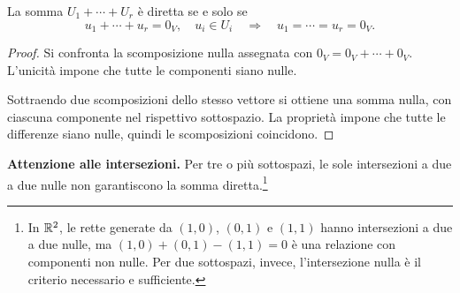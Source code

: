 \begin{osservazione}
La somma $U_1+\cdots+U_r$ è diretta se e solo se
\[
  u_1+\cdots+u_r=0_V,\quad u_i\in U_i
  \quad\Longrightarrow\quad u_1=\cdots=u_r=0_V.
\]
\end{osservazione}
\begin{proof}
\passomath{\Rightarrow} Si confronta la scomposizione nulla assegnata con $0_V=0_V+\cdots+0_V$. L'unicità impone che tutte le componenti siano nulle.

\passomath{\Leftarrow} Sottraendo due scomposizioni dello stesso vettore si ottiene una somma nulla, con ciascuna componente nel rispettivo sottospazio. La proprietà impone che tutte le differenze siano nulle, quindi le scomposizioni coincidono.
\end{proof}

\textbf{Attenzione alle intersezioni.} Per tre o più sottospazi, le sole intersezioni a due a due nulle non garantiscono la somma diretta.\footnote{In $\mathbb{R}^2$, le rette generate da $(1,0)$, $(0,1)$ e $(1,1)$ hanno intersezioni a due a due nulle, ma $(1,0)+(0,1)-(1,1)=0$ è una relazione con componenti non nulle. Per due sottospazi, invece, l'intersezione nulla è il criterio necessario e sufficiente.}
